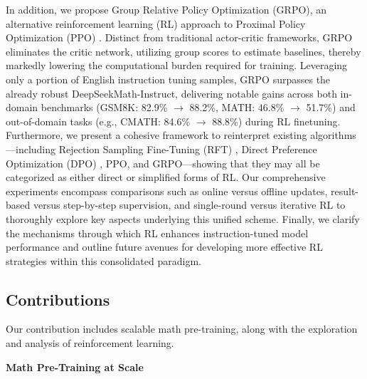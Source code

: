 In addition, we propose Group Relative Policy Optimization (GRPO), an alternative reinforcement learning (RL) approach to Proximal Policy Optimization (PPO) \citep{schulman2017proximal}. Distinct from traditional actor-critic frameworks, GRPO eliminates the critic network, utilizing group scores to estimate baselines, thereby markedly lowering the computational burden required for training. Leveraging only a portion of English instruction tuning samples, GRPO surpasses the already robust DeepSeekMath-Instruct, delivering notable gains across both in-domain benchmarks (GSM8K: 82.9\% $\rightarrow$ 88.2\%, MATH: 46.8\% $\rightarrow$ 51.7\%) and out-of-domain tasks (e.g., CMATH: 84.6\% $\rightarrow$ 88.8\%) during RL finetuning. Furthermore, we present a cohesive framework to reinterpret existing algorithms—including Rejection Sampling Fine-Tuning (RFT) \citep{yuan2023scaling}, Direct Preference Optimization (DPO) \citep{dpo}, PPO, and GRPO—showing that they may all be categorized as either direct or simplified forms of RL. Our comprehensive experiments encompass comparisons such as online versus offline updates, result-based versus step-by-step supervision, and single-round versus iterative RL to thoroughly explore key aspects underlying this unified scheme. Finally, we clarify the mechanisms through which RL enhances instruction-tuned model performance and outline future avenues for developing more effective RL strategies within this consolidated paradigm.

\subsection{Contributions}
Our contribution includes scalable math pre-training, along with the exploration and analysis of reinforcement learning.

\textbf{Math Pre-Training at Scale}

